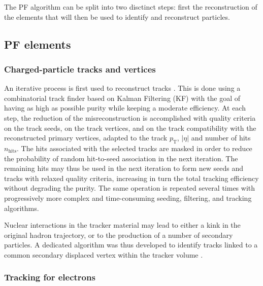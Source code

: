 \label{sec:pf}

The PF algorithm can be split into two disctinct steps: first the reconstruction of the elements that will then be used to identify and reconstruct particles.

\subsection{PF elements}

\subsubsection{Charged-particle tracks and vertices}
An iterative process is first used to reconstruct tracks \cite{Collaboration_2014}. This is done using a combinatorial track finder based on Kalman Filtering (KF) with the goal of having as high as possible purity while keeping a moderate efficiency. At each step, the reduction of the misreconstruction is accomplished with quality criteria on the track seeds, on the track vertices, and on the track compatibility with the reconstructed primary vertices, adapted to the track $p_{\mathrm{T}}$, $|\eta|$ and number of hits $n_{\mathrm{hits}}$. The hits associated with the selected tracks are masked in order to reduce the probability of random hit-to-seed association in the next iteration. The remaining hits may thus be used in the next iteration to form new seeds and tracks with relaxed quality criteria, increasing in turn the total tracking efficiency without degrading the purity. The same operation is repeated several times with progressively more complex and time-consuming seeding, filtering, and tracking algorithms.

Nuclear interactions in the tracker material may lead to either a kink in the original hadron trajectory, or to the production of a number of secondary particles. A dedicated algorithm was thus developed to identify tracks linked to a common secondary displaced vertex within the tracker volume \cite{CMS-PAS-TRK-10-003,Khachatryan2010}.

\subsubsection{Tracking for electrons}

